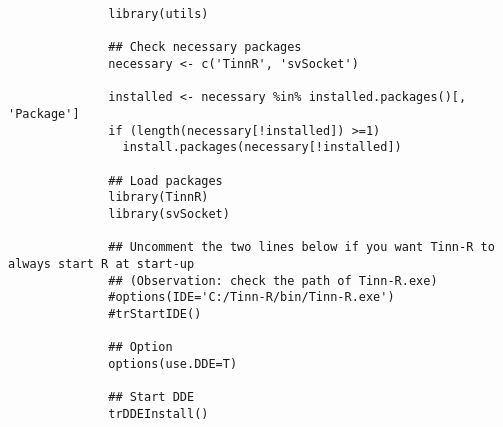 \begin{itemize}
\begin{itemize}
{{\begin{verbatim}
              library(utils)                                                                   
                                                                                               
              ## Check necessary packages                                                      
              necessary <- c('TinnR', 'svSocket')                                              
                                                                                               
              installed <- necessary %in% installed.packages()[, 'Package']                    
              if (length(necessary[!installed]) >=1)                                           
                install.packages(necessary[!installed])                                        
                                                                                               
              ## Load packages                                                                 
              library(TinnR)                                                                   
              library(svSocket)                                                                
                                                                                               
              ## Uncomment the two lines below if you want Tinn-R to always start R at start-up 
              ## (Observation: check the path of Tinn-R.exe)                                   
              #options(IDE='C:/Tinn-R/bin/Tinn-R.exe')                                         
              #trStartIDE()                                                                    
                                                                                               
              ## Option                                                                        
              options(use.DDE=T)                                                               
                                                                                               
              ## Start DDE                                                                     
              trDDEInstall()                                                                   
                                                                                               

\end{verbatim}}}
\end{itemize}
\end{itemize}
